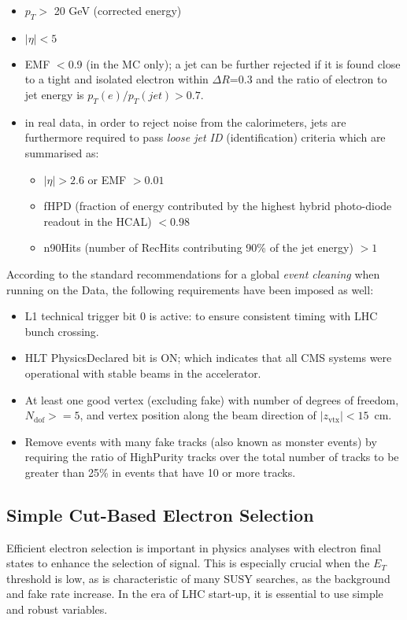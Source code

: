 \begin{itemize}
\begin{itemize}
\item $p_{T} >$ 20 GeV (corrected energy)
\item $|\eta| <5$
\item EMF $<$0.9 (in the MC only); a jet can be further rejected if it is found close to a tight and isolated electron within $\Delta R$=0.3 and the ratio of electron to jet energy is $p_{T}(e)/p_{T}(jet) > 0.7$. 
\item in real data, in order to reject noise from the calorimeters, jets are furthermore required to pass \textit{loose jet ID} (identification) criteria which are summarised as:
\begin{itemize}
\item  $|\eta| > 2.6$ or EMF $>0.01$
\item  fHPD (fraction of energy contributed by the highest hybrid photo-diode readout in the HCAL) $< 0.98$
\item  n90Hits (number of RecHits contributing 90\% of the jet energy) $> 1$
 \end{itemize}
\end{itemize}

\end{itemize}

According to the standard recommendations for a global \textit{event cleaning} when running on the Data, the following requirements have been imposed as well: 
\begin{itemize}
\item L1 technical trigger bit 0 is active: to ensure consistent timing with LHC bunch crossing.
\item HLT PhysicsDeclared bit is ON; which indicates that all CMS systems were operational with stable beams in the accelerator.
\item At least one good vertex (excluding fake) with number of degrees of freedom, $N_{\text{dof}}>=5$, and vertex position along the beam direction of $|z_{\text{vtx}}| < 15$~cm. 
\item Remove events with many fake tracks (also known as monster events) by requiring the ratio of HighPurity tracks over the total number of tracks to be greater than 25\% in events that have 10 or more tracks.
\end{itemize}

\subsection{Simple Cut-Based Electron Selection}
\label{sec:EID}
Efficient electron selection is important in physics analyses with electron final states to enhance the selection of signal. This is especially crucial when the $E_{T}$ threshold is low, as is characteristic of many SUSY searches, as the background and fake rate increase. In the era of LHC start-up, it is essential to use simple and robust variables.

